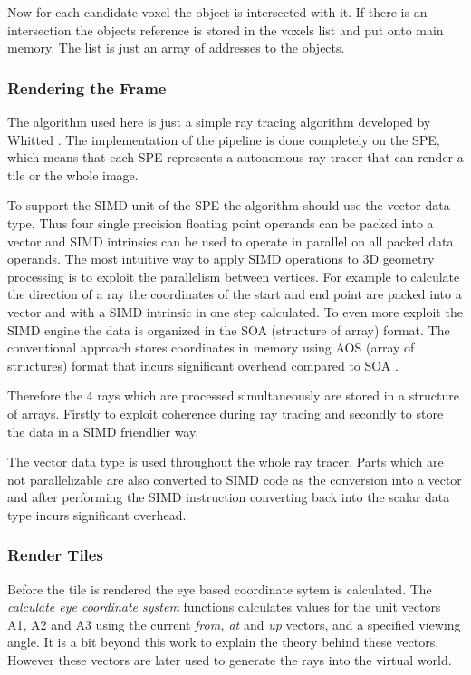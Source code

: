 \documentclass[DIV10, abstracton, openright, footsepline, headsepline, twoside, 9pt,
bigheadings]{scrreprt}
\begin{document}
Now for each candidate voxel the object is intersected with it. If there is an intersection
the objects reference is stored in the voxels list and put onto main memory. The list is just
an array of addresses to the objects.


\subsubsection{Rendering the Frame}
\label{sec:impl_rendering_the_frame}

The algorithm used here is just a simple ray tracing algorithm developed by Whitted
\cite{Whitted80}. The implementation of the pipeline is done completely on the SPE,
which means that each SPE represents a autonomous ray tracer that can render a tile
or the whole image.

To support the SIMD unit of the SPE the algorithm should use the vector data type.
Thus four single precision floating point operands can be packed into a vector
and SIMD intrinsics can be used to operate in parallel on all packed data operands.
The most intuitive way to apply SIMD operations to 3D geometry processing is to exploit
the parallelism between vertices.  For example to calculate the direction of a ray
the coordinates of the start and end point are packed into a vector and with a
SIMD intrinsic in one step calculated. To even more exploit the SIMD engine
the data is organized in the SOA (structure of array) format. The conventional
approach stores coordinates in memory using AOS (array of structures) format that
incurs significant overhead compared to SOA \cite{Ma98}.

Therefore the 4 rays which are processed simultaneously are stored in a structure
of arrays. Firstly to exploit coherence during ray tracing and secondly to store
the data in a SIMD friendlier way.

The vector data type is used throughout the whole ray tracer. Parts which are not
parallelizable are also converted to SIMD code as the conversion into a vector
and after performing the SIMD instruction converting back into the scalar data type
incurs significant overhead.


\subsubsection{Render Tiles}
\label{sec:impl_render_tiles}
Before the tile is rendered the eye based coordinate sytem is calculated. The
\textit{calculate eye coordinate system} functions calculates values for the
unit vectors A1, A2 and A3 using the current \textit{from, at} and \textit{up}
vectors, and a specified viewing angle. It is a bit beyond this work to explain
the theory behind  these vectors. However these vectors are later used
to generate the rays into the virtual world.
\end{document}
